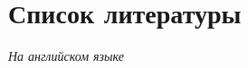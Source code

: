 \clearpage
\section{Список литературы}

\textit{На английском языке}
\printbibliography[keyword=eng, heading=none]